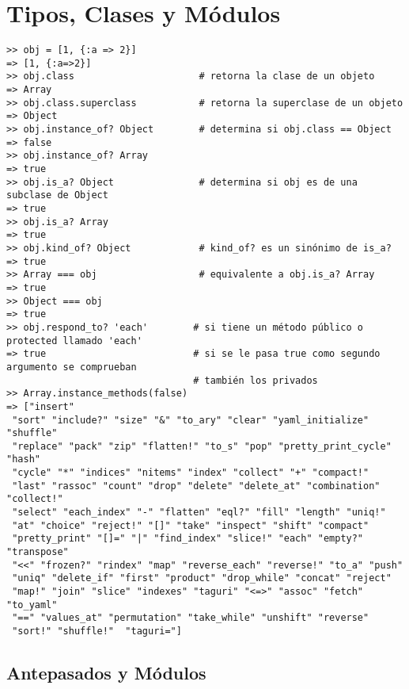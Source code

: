 \section{Tipos, Clases y Módulos}


\begin{verbatim}
>> obj = [1, {:a => 2}]
=> [1, {:a=>2}]
>> obj.class                      # retorna la clase de un objeto
=> Array
>> obj.class.superclass           # retorna la superclase de un objeto
=> Object
>> obj.instance_of? Object        # determina si obj.class == Object
=> false
>> obj.instance_of? Array
=> true
>> obj.is_a? Object               # determina si obj es de una subclase de Object
=> true
>> obj.is_a? Array
=> true
>> obj.kind_of? Object            # kind_of? es un sinónimo de is_a?
=> true
>> Array === obj                  # equivalente a obj.is_a? Array
=> true
>> Object === obj
=> true
>> obj.respond_to? 'each'        # si tiene un método público o protected llamado 'each'
=> true                          # si se le pasa true como segundo argumento se comprueban
                                 # también los privados
>> Array.instance_methods(false) 
=> ["insert"
 "sort" "include?" "size" "&" "to_ary" "clear" "yaml_initialize" "shuffle"
 "replace" "pack" "zip" "flatten!" "to_s" "pop" "pretty_print_cycle" "hash"
 "cycle" "*" "indices" "nitems" "index" "collect" "+" "compact!"
 "last" "rassoc" "count" "drop" "delete" "delete_at" "combination" "collect!"
 "select" "each_index" "-" "flatten" "eql?" "fill" "length" "uniq!"
 "at" "choice" "reject!" "[]" "take" "inspect" "shift" "compact"
 "pretty_print" "[]=" "|" "find_index" "slice!" "each" "empty?" "transpose"
 "<<" "frozen?" "rindex" "map" "reverse_each" "reverse!" "to_a" "push"
 "uniq" "delete_if" "first" "product" "drop_while" "concat" "reject"
 "map!" "join" "slice" "indexes" "taguri" "<=>" "assoc" "fetch" "to_yaml"
 "==" "values_at" "permutation" "take_while" "unshift" "reverse"
 "sort!" "shuffle!"  "taguri="]
\end{verbatim}

  \subsection{Antepasados y Módulos}
  
